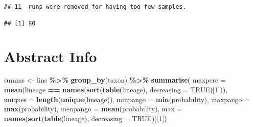 \documentclass[
]{article}
\newenvironment{Shaded}{\begin{snugshade}}{\end{snugshade}}
\newcommand{\CommentTok}[1]{\textcolor[rgb]{0.56,0.35,0.01}{\textit{#1}}}
\newcommand{\DataTypeTok}[1]{\textcolor[rgb]{0.13,0.29,0.53}{#1}}
\newcommand{\DecValTok}[1]{\textcolor[rgb]{0.00,0.00,0.81}{#1}}
\newcommand{\KeywordTok}[1]{\textcolor[rgb]{0.13,0.29,0.53}{\textbf{#1}}}
\newcommand{\NormalTok}[1]{#1}
\newcommand{\OperatorTok}[1]{\textcolor[rgb]{0.81,0.36,0.00}{\textbf{#1}}}
\newcommand{\OtherTok}[1]{\textcolor[rgb]{0.56,0.35,0.01}{#1}}
\newcommand{\StringTok}[1]{\textcolor[rgb]{0.31,0.60,0.02}{#1}}
\begin{document}
\begin{verbatim}
## 11  runs were removed for having too few samples.
\end{verbatim}

\begin{Shaded}
\end{Shaded}

\begin{verbatim}
## [1] 80
\end{verbatim}

\hypertarget{abstract-info}{%
\section{Abstract Info}\label{abstract-info}}

\begin{Shaded}
\begin{Highlighting}[]
\NormalTok{summs \textless{}{-}}\StringTok{ }\NormalTok{lins }\OperatorTok{\%\textgreater{}\%}
\StringTok{    }\KeywordTok{group\_by}\NormalTok{(taxon) }\OperatorTok{\%\textgreater{}\%}
\StringTok{    }\KeywordTok{summarise}\NormalTok{(}
        \DataTypeTok{maxperc =} \KeywordTok{mean}\NormalTok{(lineage }\OperatorTok{==}\StringTok{ }\KeywordTok{names}\NormalTok{(}\KeywordTok{sort}\NormalTok{(}\KeywordTok{table}\NormalTok{(lineage),}
            \DataTypeTok{decreasing =} \OtherTok{TRUE}\NormalTok{)[}\DecValTok{1}\NormalTok{])),}
        \DataTypeTok{uniques =} \KeywordTok{length}\NormalTok{(}\KeywordTok{unique}\NormalTok{(lineage)),}
        \DataTypeTok{minpango =} \KeywordTok{min}\NormalTok{(probability),}
        \DataTypeTok{maxpango =} \KeywordTok{max}\NormalTok{(probability),}
        \DataTypeTok{menpango =} \KeywordTok{mean}\NormalTok{(probability),}
        \DataTypeTok{max =} \KeywordTok{names}\NormalTok{(}\KeywordTok{sort}\NormalTok{(}\KeywordTok{table}\NormalTok{(lineage), }\DataTypeTok{decreasing =} \OtherTok{TRUE}\NormalTok{))[}\DecValTok{1}\NormalTok{])}
\end{Highlighting}
\end{Shaded}
\end{document}

